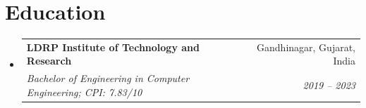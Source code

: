 \documentclass[letterpaper,10pt]{article}
\makeatletter
\newcommand{\resumeSubheading}[4]{
  \vspace{1pt}\item
  \begin{tabular*}{0.98\textwidth}[t]{l@{\extracolsep{\fill}}r}
    \textbf{#1} & #2 \\
    \textit{\small #3} & \textit{\small #4}
  \end{tabular*}
  \vspace{-2pt}
}
\newcommand{\resumeSubHeadingListStart}{
  \begin{itemize}[
    leftmargin=0.12in,
    label={},
    itemsep=0pt,
    topsep=0pt,
    parsep=0pt
  ]
}
\newcommand{\resumeSubHeadingListEnd}{\end{itemize}}
\makeatother
\begin{document}
\section{Education}
\resumeSubHeadingListStart

\resumeSubheading
  {LDRP Institute of Technology and Research}
  {Gandhinagar, Gujarat, India}
  {Bachelor of Engineering in Computer Engineering; CPI: 7.83/10}
  {2019 -- 2023}

\resumeSubHeadingListEnd
\end{document}
